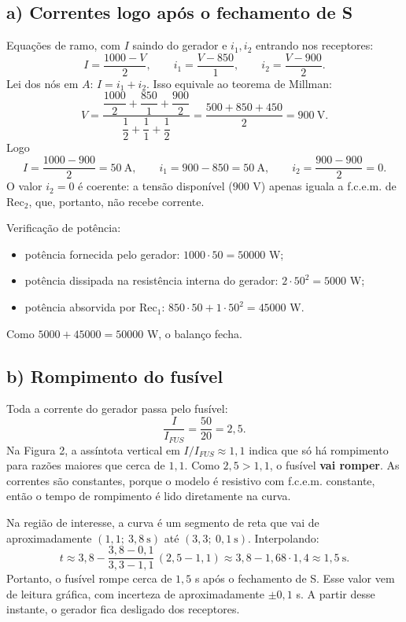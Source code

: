 \documentclass{article}%
\begin{document}
\subsection*{a) Correntes logo após o fechamento de S}

Equações de ramo, com $I$ saindo do gerador e $i_1, i_2$ entrando nos receptores:
\[
I=\frac{1000-V}{2},\qquad i_1=\frac{V-850}{1},\qquad i_2=\frac{V-900}{2}.
\]
Lei dos nós em $A$: $I=i_1+i_2$. Isso equivale ao teorema de Millman:
\[
V=\frac{\dfrac{1000}{2}+\dfrac{850}{1}+\dfrac{900}{2}}{\dfrac12+\dfrac11+\dfrac12}=\frac{500+850+450}{2}=900\ \text{V}.
\]
Logo
\[
I=\frac{1000-900}{2}=50\ \text{A},\qquad i_1=900-850=50\ \text{A},\qquad i_2=\frac{900-900}{2}=0 .
\]
O valor $i_2=0$ é coerente: a tensão disponível ($900$ V) apenas iguala a f.c.e.m. de Rec$_2$, que, portanto, não recebe corrente.

Verificação de potência:
\begin{itemize}
\item potência fornecida pelo gerador: $1000\cdot 50=50000$ W;
\item potência dissipada na resistência interna do gerador: $2\cdot 50^2=5000$ W;
\item potência absorvida por Rec$_1$: $850\cdot 50+1\cdot 50^2=45000$ W.
\end{itemize}
Como $5000+45000=50000$ W, o balanço fecha.

\subsection*{b) Rompimento do fusível}

Toda a corrente do gerador passa pelo fusível:
\[
\frac{I}{I_{FUS}}=\frac{50}{20}=2{,}5 .
\]
Na Figura 2, a assíntota vertical em $I/I_{FUS}\approx 1{,}1$ indica que só há rompimento para razões maiores que cerca de $1{,}1$. Como $2{,}5>1{,}1$, o fusível \textbf{vai romper}. As correntes são constantes, porque o modelo é resistivo com f.c.e.m. constante, então o tempo de rompimento é lido diretamente na curva.

Na região de interesse, a curva é um segmento de reta que vai de aproximadamente $(1{,}1;\ 3{,}8\ \text{s})$ até $(3{,}3;\ 0{,}1\ \text{s})$. Interpolando:
\[
t\approx 3{,}8-\frac{3{,}8-0{,}1}{3{,}3-1{,}1}\,(2{,}5-1{,}1)\approx 3{,}8-1{,}68\cdot 1{,}4\approx 1{,}5\ \text{s}.
\]
Portanto, o fusível rompe cerca de $1{,}5$ s após o fechamento de S. Esse valor vem de leitura gráfica, com incerteza de aproximadamente $\pm 0{,}1$ s. A partir desse instante, o gerador fica desligado dos receptores.
\end{document}
